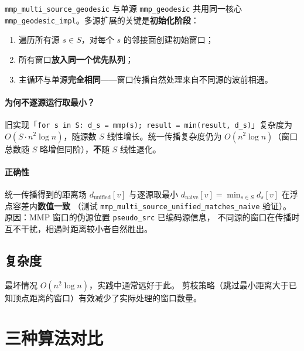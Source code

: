 \documentclass[11pt,a4paper]{article}
\begin{document}
\texttt{mmp\_multi\_source\_geodesic} 与单源 \texttt{mmp\_geodesic} 共用同一核心
\texttt{mmp\_geodesic\_impl}。多源扩展的关键是\textbf{初始化阶段}：

\begin{enumerate}
  \item 遍历所有源 $s \in S$，对每个 $s$ 的邻接面创建初始窗口；
  \item 所有窗口\textbf{放入同一个优先队列}；
  \item 主循环与单源\textbf{完全相同}——窗口传播自然处理来自不同源的波前相遇。
\end{enumerate}

\paragraph{为何不逐源运行取最小？}
旧实现「\texttt{for s in S: d\_s = mmp(s); result = min(result, d\_s)}」复杂度为
$O(S \cdot n^2 \log n)$，随源数 $S$ 线性增长。统一传播复杂度仍为
$O(n^2 \log n)$（窗口总数随 $S$ 略增但同阶），\textbf{不}随 $S$ 线性退化。

\paragraph{正确性}
统一传播得到的距离场 $d_{\text{unified}}[v]$ 与逐源取最小
$d_{\text{naive}}[v] = \min_{s \in S} d_s[v]$ 在浮点容差内\textbf{数值一致}
（测试 \texttt{mmp\_multi\_source\_unified\_matches\_naive} 验证）。
原因：MMP 窗口的伪源位置 \texttt{pseudo\_src} 已编码源信息，
不同源的窗口在传播时互不干扰，相遇时距离较小者自然胜出。

\subsection{复杂度}

最坏情况 $O(n^2 \log n)$，实践中通常远好于此。
剪枝策略（跳过最小距离大于已知顶点距离的窗口）有效减少了实际处理的窗口数量。

\section{三种算法对比}
\end{document}
